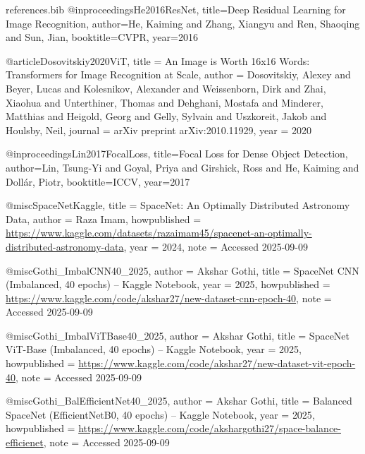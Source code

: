 \begin{filecontents*}{references.bib}
@inproceedings{He2016ResNet,
  title={Deep Residual Learning for Image Recognition},
  author={He, Kaiming and Zhang, Xiangyu and Ren, Shaoqing and Sun, Jian},
  booktitle={CVPR},
  year={2016}
}

@article{Dosovitskiy2020ViT,
  title   = {An Image is Worth 16x16 Words: Transformers for Image Recognition at Scale},
  author  = {Dosovitskiy, Alexey and Beyer, Lucas and Kolesnikov, Alexander and Weissenborn, Dirk and Zhai, Xiaohua and Unterthiner, Thomas and Dehghani, Mostafa and Minderer, Matthias and Heigold, Georg and Gelly, Sylvain and Uszkoreit, Jakob and Houlsby, Neil},
  journal = {arXiv preprint arXiv:2010.11929},
  year    = {2020}
}

@inproceedings{Lin2017FocalLoss,
  title={Focal Loss for Dense Object Detection},
  author={Lin, Tsung-Yi and Goyal, Priya and Girshick, Ross and He, Kaiming and Doll{\'a}r, Piotr},
  booktitle={ICCV},
  year={2017}
}

@misc{SpaceNetKaggle,
  title        = {SpaceNet: An Optimally Distributed Astronomy Data},
  author       = {Raza Imam},
  howpublished = {\url{https://www.kaggle.com/datasets/razaimam45/spacenet-an-optimally-distributed-astronomy-data}},
  year         = {2024},
  note         = {Accessed 2025-09-09}
}

@misc{Gothi_ImbalCNN40_2025,
  author       = {Akshar Gothi},
  title        = {SpaceNet CNN (Imbalanced, 40 epochs) -- Kaggle Notebook},
  year         = {2025},
  howpublished = {\url{https://www.kaggle.com/code/akshar27/new-dataset-cnn-epoch-40}},
  note         = {Accessed 2025-09-09}
}

@misc{Gothi_ImbalViTBase40_2025,
  author       = {Akshar Gothi},
  title        = {SpaceNet ViT-Base (Imbalanced, 40 epochs) -- Kaggle Notebook},
  year         = {2025},
  howpublished = {\url{https://www.kaggle.com/code/akshar27/new-dataset-vit-epoch-40}},
  note         = {Accessed 2025-09-09}
}

@misc{Gothi_BalEfficientNet40_2025,
  author       = {Akshar Gothi},
  title        = {Balanced SpaceNet (EfficientNetB0, 40 epochs) -- Kaggle Notebook},
  year         = {2025},
  howpublished = {\url{https://www.kaggle.com/code/akshargothi27/space-balance-efficienet}},
  note         = {Accessed 2025-09-09}
}


\end{filecontents*}
